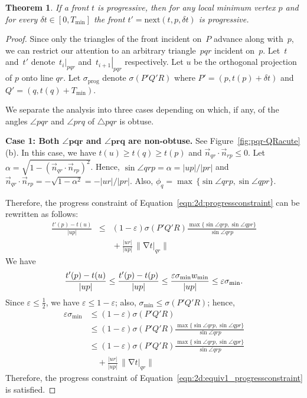 \documentclass[twocolumn]{article}
\def\minW{\ensuremath{w_{\text{min}}}}
\def\S{\ensuremath{\sigma}}
\def\minS{\ensuremath{\S_{\text{min}}}}
\def\minT{\ensuremath{T_{\text{min}}}}
\def\progS{\ensuremath{\S_{\text{prog}}}}
\def\e{\ensuremath{\varepsilon}}
\def\fp{\ensuremath{P}}
\def\fq{\ensuremath{Q}}
\def\fr{\ensuremath{R}}
\DeclareMathOperator{\grad}{\ensuremath{\nabla}}
\def\abs#1{\ensuremath{\mathopen| #1 \mathclose|}}
\def\norm#1{\ensuremath{\mathopen\| #1 \mathclose\|}}
\def\dt{\ensuremath{\delta t}}
\def\rest#1#2{\ensuremath{\left. #1 \right|_{#2}}}
\def\next{\text{next}}
\def\half{\ensuremath{\frac{1}{2}}}
\newtheorem{theorem}[lemma]{Theorem}
\begin{document}
\begin{theorem}
  If a front $t$ is progressive, then for any local minimum vertex $p$
  and for every $\dt \in [0,\minT]$ the front $t' = \next(t,p,\dt)$ is
  progressive.
\label{thm:2d:isprogressive}
\end{theorem}
\begin{proof}
Since only the triangles of the front incident on~$\fp$ advance
along with~$p$, we can restrict our attention to an arbitrary
triangle~$pqr$ incident on~$p$.  Let~$t$
and~$t'$ denote~$\rest{t_i}{pqr}$
and~$\rest{t_{i+1}}{pqr}$ respectively.
Let $u$ be the orthogonal projection of $p$ onto line $qr$.
Let $\progS$ denote $\S(\fp'\fq'\fr)$ where $\fp'=(p,t(p)+\dt)$ and
$\fq'=(q,t(q)+\minT)$.

We separate the analysis into three cases depending on which, if any,
of the angles $\angle{pqr}$ and $\angle{prq}$ of $\triangle{pqr}$ is
obtuse.

\noindent\textbf{Case 1: Both $\mathbf{\angle{pqr}}$ and
  $\mathbf{\angle{prq}}$ are non-obtuse.}
See Figure~\ref{fig:pqr-QRacute}(b).  In this case, we have $t(u) \ge
t(q) \ge t(p)$ and $\vec{n}_{qr} \cdot \vec{n}_{rp} \le 0$.  Let
$\alpha = \sqrt{1 - (\vec{n}_{qr} \cdot \vec{n}_{rp})^2}$.  Hence,
$\sin \angle{qrp} = \alpha = \abs{up}/\abs{pr}$ and
$\vec{n}_{qr} \cdot \vec{n}_{rp} = - \sqrt{1 - \alpha^2}
= - \abs{ur}/\abs{pr}$.  Also, $\phi_q = \max\,\{\sin \angle{qrp}, \sin
\angle{qpr}\}$.

Therefore, the progress constraint of
Equation~\ref{eqn:2d:progressconstraint} can be rewritten as follows:
\begin{equation}
\begin{array}{rcl}
  \frac{t'(p) - t(u)}{\abs{up}}
&\le&
  (1-\e) \S(\fp'\fq'\fr) 
  \frac{\max\{\sin \angle{qrp}, \sin \angle{qpr}\}}{\sin \angle{qrp}}\\[2ex]
&&
  {}+{} \frac{\abs{ur}}{\abs{up}} \, \norm{\grad \rest{t}{qr}}
\end{array}
\label{eqn:2d:equiv1_progressconstraint}
\end{equation}
We have
\[
\frac{t'(p) - t(u)}{\abs{up}}
\le 
  \frac{t'(p) - t(p)}{\abs{up}}\\
\le
  \frac{\e \minS \minW}{\abs{up}}\\
\le
  \e \minS.
\]
Since $\e \le \half$, we have $\e \le 1-\e$; also, $\minS \le
\S(\fp'\fq'\fr)$; hence,
\begin{align*}
\e \minS
&\le
  (1-\e) \S(\fp'\fq'\fr)\\
&\le
  (1-\e) \S(\fp'\fq'\fr) 
  \frac{\max\{\sin \angle{qrp}, \sin \angle{qpr}\}}{\sin \angle{qrp}}\\
&\le
  (1-\e) \S(\fp'\fq'\fr) 
  \frac{\max\{\sin \angle{qrp}, \sin \angle{qpr}\}}{\sin \angle{qrp}}\\
&\quad {}+{} \frac{\abs{ur}}{\abs{up}} \, \norm{\grad \rest{t}{qr}}
\end{align*}
Therefore, the progress constraint of
Equation~\ref{eqn:2d:equiv1_progressconstraint} is satisfied.



\end{proof}
\end{document}
